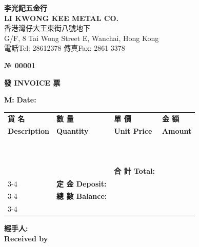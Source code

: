 \documentclass[UTF8]{ctexrep}
\begin{document}
\pagestyle{empty}


\vspace{0.5cm}

\begin{center}
    {\huge \textbf{李光記五金行}} \\
    {\large \textbf{LI KWONG KEE METAL CO.}} \\[0.2cm]
    香港灣仔大王東街八號地下 \\
    G/F, 8 Tai Wong Street E, Wanchai, Hong Kong \\[0.1cm]
    電話Tel: 28612378 \quad 傳真Fax: 2861 3378
\end{center}

\hfill {\color{red} \Large \textbf{№ 00001}}

\vspace{-0.5cm}

\begin{center}
    {\LARGE \textbf{發 INVOICE 票}}
\end{center}

\noindent \textbf{M:} \underline{\hspace{8cm}} \hfill \textbf{Date:} \underline{\hspace{5cm}}

\vspace{0.5cm}

\noindent
\begin{tabularx}{\textwidth}{|X|p{2.5cm}|p{2.5cm}|p{2.5cm}|}
    \hline
    \centering \textbf{貨 名} & \centering \textbf{數 量} & \centering \textbf{單 價} & \centering \textbf{金 額} \tabularnewline
    \centering \textbf{Description} & \centering \textbf{Quantity} & \centering \textbf{Unit Price} & \centering \textbf{Amount} \tabularnewline \hline
    & & & \\ \hline
    & & & \\ \hline
    & & & \\ \hline
    & & & \\ \hline
    & & & \\ \hline
    & & & \\ \hline
    & & & \\ \hline
    & & & \\ \hline
    & & & \\ \hline
    & & & \\ \hline
    \multicolumn{2}{c|}{} & \textbf{合 計 Total:} & \\ \cline{3-4}
    \multicolumn{2}{c|}{} & \textbf{定 金 Deposit:} & \\ \cline{3-4}
    \multicolumn{2}{c|}{} & \textbf{總 數 Balance:} & \\ \cline{3-4}
\end{tabularx}

\vspace{1cm}

\noindent \textbf{經手人:} \\
\textbf{Received by} \underline{\hspace{6cm}}
\end{document}

